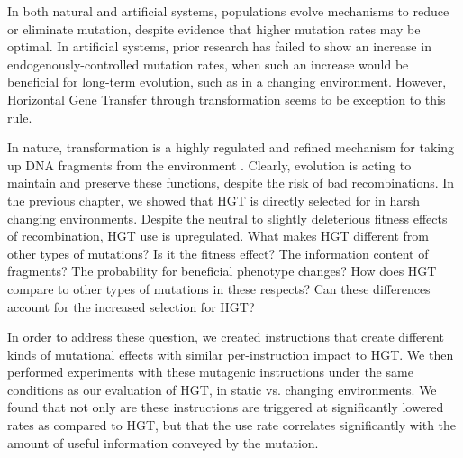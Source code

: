 \documentclass[PhD]{msu-thesis}
\begin{document}
In both natural and artificial systems, populations evolve mechanisms to reduce or eliminate mutation\cite{wielgoss_mutation_2013}, despite evidence that higher mutation rates may be optimal\cite{clune_natural_2008}.
In artificial systems, prior research has failed to show an increase in endogenously-controlled mutation rates, when such an increase would be beneficial for long-term evolution, such as in a changing environment\cite{clune_natural_2008}. However, Horizontal Gene Transfer through transformation seems to be exception to this rule.  

In nature, transformation is a highly regulated and refined mechanism for taking up DNA fragments from the environment \cite{solomon_whos_1996,seitz_cues_2013,fontaine_novel_2010}. 
Clearly, evolution
is acting to maintain and preserve these functions, despite the risk of bad recombinations. In the previous chapter, we showed that HGT is directly selected for in harsh changing environments. Despite the neutral to slightly deleterious fitness effects of recombination, HGT use is upregulated.
What makes HGT different from other types of mutations?
Is it the fitness effect? The information content of fragments? The probability for beneficial phenotype changes? 
How does HGT compare to other types of mutations in these respects?
Can these differences account for the increased selection for HGT? 

In order to address these question, we created instructions that create different kinds of mutational effects with similar per-instruction impact to HGT. We then performed experiments with these mutagenic instructions under the same conditions as our evaluation of HGT, in static vs. changing environments. We found that not only are these instructions are triggered at significantly lowered rates as compared to HGT, but that the use rate correlates significantly with the amount of useful information conveyed by the mutation. 
\end{document}
